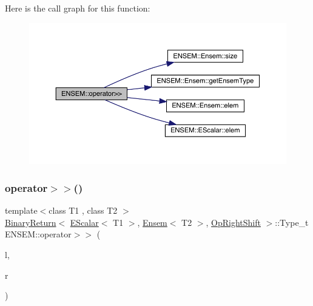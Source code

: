 Here is the call graph for this function\+:\nopagebreak
\begin{figure}[H]
\begin{center}
\leavevmode
\includegraphics[width=350pt]{d1/d9e/group__eensem_ga1741fb098dc44e2f5fcd2bcabeafa0ed_cgraph}
\end{center}
\end{figure}
\mbox{\label{group__eensem_ga8dbc329d9b31f5c8d7f4c54f10ea370b}} 
\subsubsection{\texorpdfstring{operator$>$$>$()}{operator>>()}\hspace{0.1cm}{\footnotesize\ttfamily [4/4]}}
{\footnotesize\ttfamily template$<$class T1 , class T2 $>$ \\
\mbox{\hyperlink{structENSEM_1_1BinaryReturn}{Binary\+Return}}$<$ \mbox{\hyperlink{classENSEM_1_1EScalar}{E\+Scalar}}$<$ T1 $>$, \mbox{\hyperlink{classENSEM_1_1Ensem}{Ensem}}$<$ T2 $>$, \mbox{\hyperlink{structENSEM_1_1OpRightShift}{Op\+Right\+Shift}} $>$\+::Type\+\_\+t E\+N\+S\+E\+M\+::operator$>$$>$ (\begin{DoxyParamCaption}\item[{const \mbox{\hyperlink{classENSEM_1_1EScalar}{E\+Scalar}}$<$ T1 $>$ \&}]{l,  }\item[{const \mbox{\hyperlink{classENSEM_1_1Ensem}{Ensem}}$<$ T2 $>$ \&}]{r }\end{DoxyParamCaption})\hspace{0.3cm}{\ttfamily [inline]}}

